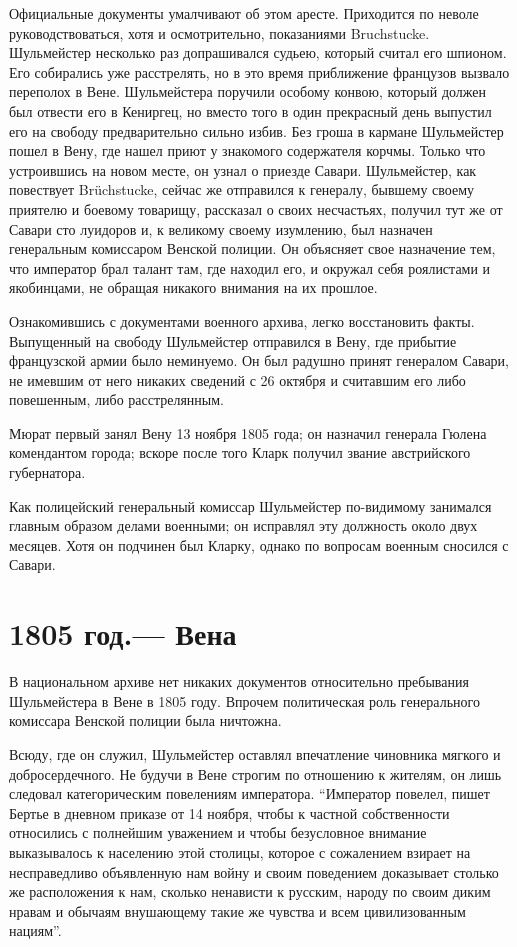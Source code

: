 \documentclass[
  oneside,
  12pt,
  titlepage]{book}
\begin{document}
Официальные документы умалчивают об этом аресте. Приходится по неволе руководствоваться, хотя и осмотрительно, показаниями Bruchstucke. Шульмейстер несколько раз допрашивался судьею, который считал его шпионом. Его собирались уже расстрелять, но в это время приближение французов вызвало переполох в Вене. Шульмейстера поручили особому конвою, который должен был отвести его в Кениргец, но вместо того в один прекрасный день выпустил его на свободу предварительно сильно избив. Без гроша в кармане Шульмейстер пошел в Вену, где нашел приют у знакомого содержателя корчмы. Только что устроившись на новом месте, он узнал о приезде Савари. Шульмейстер, как повествует Brüchstucke, сейчас же отправился к генералу, бывшему своему приятелю и боевому товарищу, рассказал о своих несчастьях, получил тут же от Савари сто луидоров и, к великому своему изумлению, был назначен генеральным комиссаром Венской полиции. Он объясняет свое назначение тем, что император брал талант там, где находил его, и окружал себя роялистами и якобинцами, не обращая никакого внимания на их прошлое.

Ознакомившись с документами военного архива, легко восстановить факты. Выпущенный на свободу Шульмейстер отправился в Вену, где прибытие французской армии было неминуемо. Он был радушно принят генералом Савари, не имевшим от него никаких сведений с 26 октября и считавшим его либо повешенным, либо расстрелянным.

Мюрат первый занял Вену 13 ноября 1805 года; он назначил генерала Гюлена комендантом города; вскоре после того Кларк получил звание австрийского губернатора.

Как полицейский генеральный комиссар Шульмейстер по-видимому занимался главным образом делами военными; он исправлял эту должность около двух месяцев. Хотя он подчинен был Кларку, однако по вопросам военным сносился с Савари.

\hypertarget{ux433ux43eux434.-ux432ux435ux43dux430}{%
\chapter{1805 год.--- Вена}\label{ux433ux43eux434.-ux432ux435ux43dux430}}

В национальном архиве нет никаких документов относительно пребывания Шульмейстера в Вене в 1805 году. Впрочем политическая роль генерального комиссара Венской полиции была ничтожна.

Всюду, где он служил, Шульмейстер оставлял впечатление чиновника мягкого и добросердечного. Не будучи в Вене строгим по отношению к жителям, он лишь следовал категорическим повелениям императора. ``Император повелел, пишет Бертье в дневном приказе от 14 ноября, чтобы к частной собственности относились с полнейшим уважением и чтобы безусловное внимание выказывалось к населению этой столицы, которое с сожалением взирает на несправедливо объявленную нам войну и своим поведением доказывает столько же расположения к нам, сколько ненависти к русским, народу по своим диким нравам и обычаям внушающему такие же чувства и всем цивилизованным нациям''.
\end{document}
